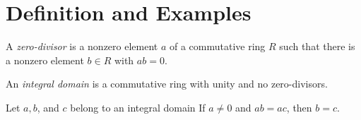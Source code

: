 \section{Definition and Examples}

\begin{definition}
	A \textit{zero-divisor} is a nonzero element $a$ of a commutative ring $R$ such that there is a nonzero element $b \in R$ with $ab = 0$.
\end{definition}

\begin{definition}
	An \textit{integral domain} is a commutative ring with unity and no zero-divisors.
\end{definition}

\begin{theorem}[Cancellation]
	Let $a,b$, and $c$ belong to an integral domain If $a \neq 0$ and $ab = ac$, then $b = c$.
\end{theorem}
